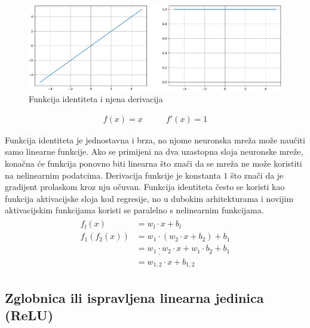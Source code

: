 \documentclass[times, utf8, numeric, diplomski]{fer}
\begin{document}
\begin{figure}[H]
\includegraphics[width=\textwidth]{func_Identity.pdf}
\centering
\caption{Funkcija identiteta i njena derivacija}
\label{fig:identity}
\end{figure}

\begin{equation}
\begin{split}
f(x) = x
\end{split}
\qquad
\begin{split}
f'(x) = 1
\end{split}
\end{equation}

Funkcija identiteta je jednostavna i brza, no njome neuronska mreža može naučiti samo linearne funkcije. Ako se primijeni na dva uzastopna sloja neuronske mreže, konačna će funkcija ponovno biti linearna što znači da se mreža ne može koristiti na nelinearnim podatcima. Derivacija funkcije je konstanta $1$ što znači da je gradijent prolaskom kroz nju očuvan. Funkcija identiteta često se koristi kao funkcija aktivacijske sloja kod regresije, no u dubokim arhitekturama \citep{resnet,densenet} i novijim aktivacijskim funkcijama \citep{swish,elish} koristi se paralelno s nelinearnim funkcijama.
\begin{align}
\begin{split}
f_l(x) &= w_l \cdot x + b_l \\
f_1(f_2(x)) &= w_1 \cdot (w_2 \cdot x + b_2) + b_1 \\
&= \underline{w_1 \cdot w_2} \cdot x + \underline{w_1 \cdot b_2 + b_1} \\
&= w_{1,2} \cdot x + b_{1,2}
\end{split}
\end{align}

\subsection{Zglobnica ili ispravljena linearna jedinica (ReLU)}
\label{func:relu}
\end{document}
